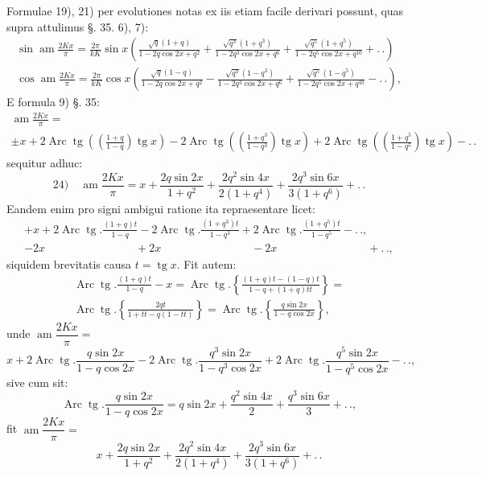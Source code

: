 \documentclass{article}
\begin{document}
Formulae 19), 21) per evolutiones notas ex iis etiam facile derivari possunt, quas supra attulimus §. 35. 6), 7):
\[
\begin{gathered}
\sin\operatorname{am}\frac{2Kx}{\pi}=\frac{2\pi}{kK}\sin x\left(\frac{\sqrt{q}(1+q)}{1-2q\cos2x+q^{2}}+\frac{\sqrt{q^{3}}(1+q^{3})}{1-2q^{3}\cos2x+q^{6}}+\frac{\sqrt{q^{5}}(1+q^{5})}{1-2q^{5}\cos2x+q^{10}}+.\,.\right)\\[2ex]
\cos\operatorname{am}\frac{2Kx}{\pi}=\frac{2\pi}{kK}\cos x\left(\frac{\sqrt{q}(1-q)}{1-2q\cos2x+q^{2}}-\frac{\sqrt{q^{3}}(1-q^{3})}{1-2q^{3}\cos2x+q^{6}}+\frac{\sqrt{q^{5}}(1-q^{5})}{1-2q^{5}\cos2x+q^{10}}-.\,.\right),
\end{gathered}
\]
E formula 9) §. 35:
\[
\begin{gathered}
\operatorname{am}\frac{2Kx}{\pi}=\\[1.5ex]
\pm x+2\operatorname{Arc}\operatorname{tg}\left(\left(\frac{1+q}{1-q}\right)\operatorname{tg}x\right)-2\operatorname{Arc}\operatorname{tg}\left(\left(\frac{1+q^{3}}{1-q^{3}}\right)\operatorname{tg}x\right)+2\operatorname{Arc}\operatorname{tg}\left(\left(\frac{1+q^{5}}{1-q^{5}}\right)\operatorname{tg}x\right)-.\,.
\end{gathered}
\]
sequitur adhuc:
\[
\text{24)}\quad\operatorname{am}\frac{2Kx}{\pi}=x+\frac{2q\sin2x}{1+q^{2}}+\frac{2q^{2}\sin4x}{2(1+q^{4})}+\frac{2q^{3}\sin6x}{3(1+q^{6})}+.\,.
\]
Eandem enim pro signi ambigui ratione ita repraesentare licet:
\[
\begin{gathered}
+x+2\operatorname{Arc}\operatorname{tg}.\frac{(1+q)t}{1-q}-2\operatorname{Arc}\operatorname{tg}.\frac{(1+q^{3})t}{1-q^{3}}+2\operatorname{Arc}\operatorname{tg}.\frac{(1+q^{5})t}{1-q^{5}}-.\,.,\\[1.5ex]
-2x\qquad\qquad\qquad\qquad+2x\qquad\qquad\qquad\qquad-2x\qquad\qquad\qquad\qquad+.\,.,
\end{gathered}
\]
siquidem brevitatis causa $t=\operatorname{tg}x$. Fit autem:
\[
\begin{gathered}
\operatorname{Arc}\operatorname{tg}.\frac{(1+q)t}{1-q}-x=\operatorname{Arc}\operatorname{tg}.\left\{\frac{(1+q)t-(1-q)t}{1-q+(1+q)tt}\right\}=\\[1.5ex]
\operatorname{Arc}\operatorname{tg}.\left\{\frac{2qt}{1+tt-q(1-tt)}\right\}=\operatorname{Arc}\operatorname{tg}.\left\{\frac{q\sin2x}{1-q\cos2x}\right\},
\end{gathered}
\]
unde $\operatorname{am}\dfrac{2Kx}{\pi}=$
\[
x+2\operatorname{Arc}\operatorname{tg}.\frac{q\sin2x}{1-q\cos2x}-2\operatorname{Arc}\operatorname{tg}.\frac{q^{3}\sin2x}{1-q^{3}\cos2x}+2\operatorname{Arc}\operatorname{tg}.\frac{q^{5}\sin2x}{1-q^{5}\cos2x}-.\,.,
\]
sive cum sit:
\[
\operatorname{Arc}\operatorname{tg}.\frac{q\sin2x}{1-q\cos2x}=q\sin2x+\frac{q^{2}\sin4x}{2}+\frac{q^{3}\sin6x}{3}+.\,.,
\]
fit $\operatorname{am}\dfrac{2Kx}{\pi}=$
\[
x+\frac{2q\sin2x}{1+q^{2}}+\frac{2q^{2}\sin4x}{2(1+q^{4})}+\frac{2q^{3}\sin6x}{3(1+q^{6})}+.\,.
\]
\end{document}
